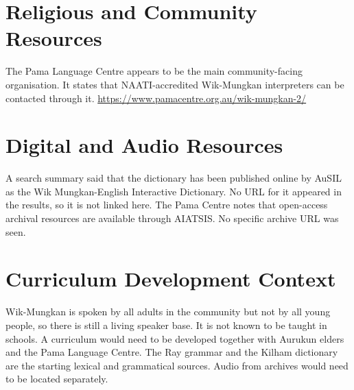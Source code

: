 \documentclass[12pt]{article}
\begin{document}
\section{Religious and Community Resources}
The Pama Language Centre appears to be the main community-facing organisation. It states that NAATI-accredited Wik-Mungkan interpreters can be contacted through it. \url{https://www.pamacentre.org.au/wik-mungkan-2/}

\section{Digital and Audio Resources}
A search summary said that the dictionary has been published online by AuSIL as the Wik Mungkan-English Interactive Dictionary. No URL for it appeared in the results, so it is not linked here. The Pama Centre notes that open-access archival resources are available through AIATSIS. No specific archive URL was seen.

\section{Curriculum Development Context}
Wik-Mungkan is spoken by all adults in the community but not by all young people, so there is still a living speaker base. It is not known to be taught in schools. A curriculum would need to be developed together with Aurukun elders and the Pama Language Centre. The Ray grammar and the Kilham dictionary are the starting lexical and grammatical sources. Audio from archives would need to be located separately.
\end{document}

